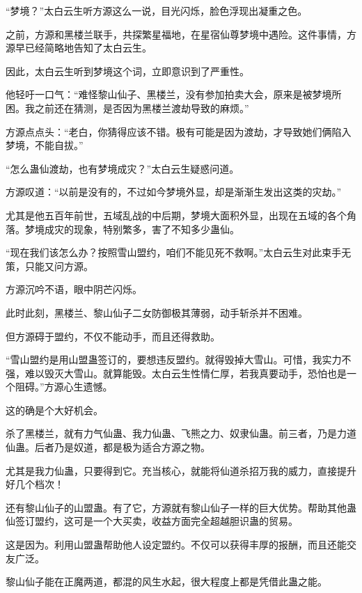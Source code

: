 
\begin{this_body}

“梦境？”太白云生听方源这么一说，目光闪烁，脸色浮现出凝重之色。

之前，方源和黑楼兰联手，共探繁星福地，在星宿仙尊梦境中遇险。这件事情，方源早已经简略地告知了太白云生。

因此，太白云生听到梦境这个词，立即意识到了严重性。

他轻吁一口气：“难怪黎山仙子、黑楼兰，没有参加拍卖大会，原来是被梦境所困。我之前还在猜测，是否因为黑楼兰渡劫导致的麻烦。”

方源点点头：“老白，你猜得应该不错。极有可能是因为渡劫，才导致她们俩陷入梦境，不能自拔。”

“怎么蛊仙渡劫，也有梦境成灾？”太白云生疑惑问道。

方源叹道：“以前是没有的，不过如今梦境外显，却是渐渐生发出这类的灾劫。”

尤其是他五百年前世，五域乱战的中后期，梦境大面积外显，出现在五域的各个角落。梦境成灾的现象，特别繁多，害了不知多少蛊仙。

“现在我们该怎么办？按照雪山盟约，咱们不能见死不救啊。”太白云生对此束手无策，只能又问方源。

方源沉吟不语，眼中阴芒闪烁。

此时此刻，黑楼兰、黎山仙子二女防御极其薄弱，动手斩杀并不困难。

但方源碍于盟约，不仅不能动手，而且还得救助。

“雪山盟约是用山盟蛊签订的，要想违反盟约。就得毁掉大雪山。可惜，我实力不强，难以毁灭大雪山。就算能毁。太白云生性情仁厚，若我真要动手，恐怕也是一个阻碍。”方源心生遗憾。

这的确是个大好机会。

杀了黑楼兰，就有力气仙蛊、我力仙蛊、飞熊之力、奴隶仙蛊。前三者，乃是力道仙蛊。后者乃是奴道，都是极为适合方源之物。

尤其是我力仙蛊，只要得到它。充当核心，就能将仙道杀招万我的威力，直接提升好几个档次！

还有黎山仙子的山盟蛊。有了它，方源就有黎山仙子一样的巨大优势。帮助其他蛊仙签订盟约，这可是一个大买卖，收益方面完全超越胆识蛊的贸易。

这是因为。利用山盟蛊帮助他人设定盟约。不仅可以获得丰厚的报酬，而且还能交友广泛。

黎山仙子能在正魔两道，都混的风生水起，很大程度上都是凭借此蛊之能。


\end{this_body}

